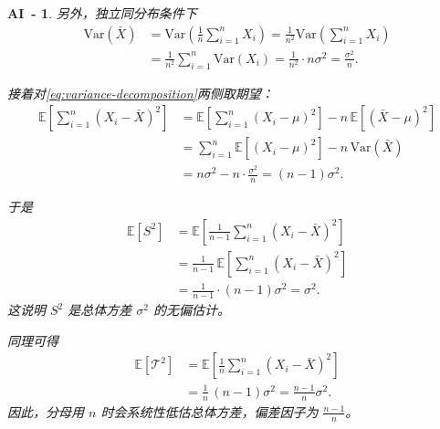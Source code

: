 \documentclass[a4paper]{ctexart}
\newtheorem{AI}{AI~-}
\begin{document}
\begin{AI}
    另外，独立同分布条件下
    \begin{equation}
        \begin{split}
            \mathrm{Var}(\bar{X})
             & = \mathrm{Var}\left(\frac{1}{n}\sum_{i=1}^{n}X_i\right)
            = \frac{1}{n^2}\mathrm{Var}\left(\sum_{i=1}^{n}X_i\right)  \\
             & = \frac{1}{n^2}\sum_{i=1}^{n}\mathrm{Var}(X_i)
            = \frac{1}{n^2}\cdot n\sigma^2
            = \frac{\sigma^2}{n}.
        \end{split}
    \end{equation}

    接着对\eqref{eq:variance-decomposition}两侧取期望：
    \begin{equation}
        \begin{split}
            \mathbb{E}\left[\sum_{i=1}^{n}{(X_i-\bar{X})}^2\right]
             & = \mathbb{E}\left[\sum_{i=1}^{n}{(X_i-\mu)}^2\right]
            - n\,\mathbb{E}\left[{(\bar{X}-\mu)}^2\right]           \\
             & = \sum_{i=1}^{n}\mathbb{E}[{(X_i-\mu)}^2]
            - n\,\mathrm{Var}(\bar{X})                              \\
             & = n\sigma^2 - n\cdot\frac{\sigma^2}{n}
            = (n-1)\sigma^2.
        \end{split}
    \end{equation}

    于是
    \begin{equation}
        \begin{split}
            \mathbb{E}[S^2]
             & = \mathbb{E}\left[\frac{1}{n-1}\sum_{i=1}^{n}{(X_i-\bar{X})}^2\right]   \\
             & = \frac{1}{n-1}\,\mathbb{E}\left[\sum_{i=1}^{n}{(X_i-\bar{X})}^2\right] \\
             & = \frac{1}{n-1}\cdot (n-1)\sigma^2
            = \sigma^2.
        \end{split}
    \end{equation}
    这说明 $S^2$ 是总体方差 $\sigma^2$ 的无偏估计。

    同理可得
    \begin{equation}
        \begin{split}
            \mathbb{E}[\mathcal{T}^2]
             & = \mathbb{E}\left[\frac{1}{n}\sum_{i=1}^{n}{(X_i-\bar{X})}^2\right] \\
             & = \frac{1}{n}\,(n-1)\sigma^2
            = \frac{n-1}{n}\sigma^2.
        \end{split}
    \end{equation}
    因此，分母用 $n$ 时会系统性低估总体方差，偏差因子为 $\frac{n-1}{n}$。

\end{AI}
\end{document}
